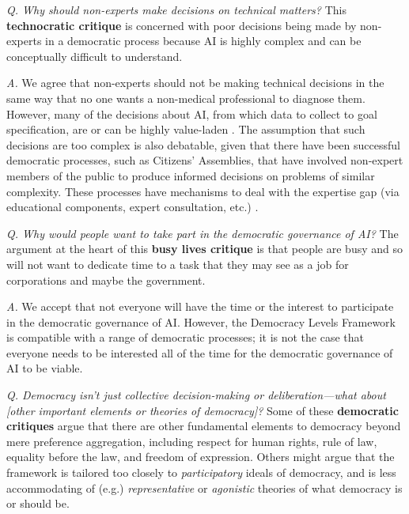 \documentclass{article}
\begin{document}
    \textit{Q. Why should non-experts make decisions on technical matters?} This \textbf{technocratic critique} is concerned with poor decisions being made by non-experts in a democratic process because AI is highly complex and can be conceptually difficult to understand.

    \textit{A.} We agree that non-experts should not be making technical decisions in the same way that no one wants a non-medical professional to diagnose them. However, many of the decisions about AI, from which data to collect to goal specification, are or can be highly value-laden \cite{elish2018}. 
    The assumption that such decisions are too complex is also debatable, given that there have been successful democratic processes, such as Citizens' Assemblies, that have involved non-expert members of the public to produce informed decisions on problems of similar complexity. 
    These processes have mechanisms to deal with the expertise gap (via educational components, expert consultation, etc.) \cite{Warren2015CanDM, Leino2022ExpertHI}.

    \textit{Q. Why would people want to take part in the democratic governance of AI?} The argument at the heart of this \textbf{busy lives critique} is that people are busy and so will not want to dedicate time to a task that they may see as a job for corporations and maybe the government. 
    
    \textit{A.} We accept that not everyone will have the time or the interest to participate in the democratic governance of AI. However, the Democracy Levels Framework is compatible with a range of democratic processes; it is not the case that everyone needs to be interested all of the time for the democratic governance of AI to be viable. 

    \textit{Q. Democracy isn't just collective decision-making or deliberation---what about [other important elements or theories of democracy]?} Some of these \textbf{democratic critiques} argue that there are other fundamental elements to democracy beyond mere preference aggregation, including respect for human rights, rule of law, equality before the law, and freedom of expression. Others might argue that the framework is tailored too closely to \textit{participatory} ideals of democracy, and is less accommodating of (e.g.) \textit{representative} \cite{urbinati2006} or \textit{agonistic} \cite{mouffe1999} theories of what democracy is or should be.
    
\end{document}
